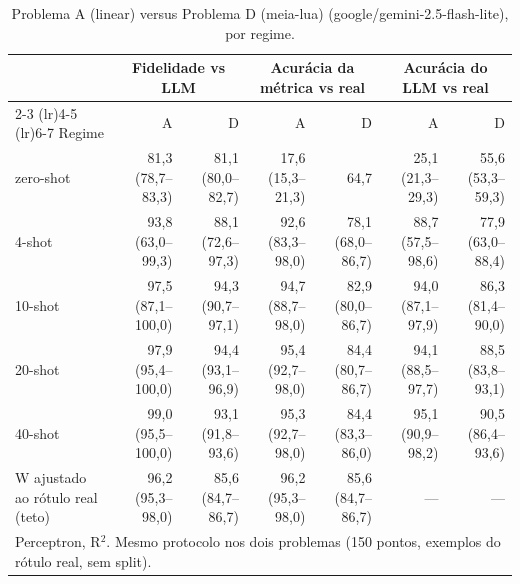 \begin{table}[htbp]
\centering
\small
\caption{Problema A (linear) versus Problema D (meia-lua) (google/gemini-2.5-flash-lite), por regime.}
\label{tab:bloco1_A_vs_D_por_regime_flashlite}
\begin{tabular}{lrrrrrr}
\toprule
 & \multicolumn{2}{c}{Fidelidade vs LLM} & \multicolumn{2}{c}{Acurácia da métrica vs real} & \multicolumn{2}{c}{Acurácia do LLM vs real} \\ \cmidrule(lr){2-3} \cmidrule(lr){4-5} \cmidrule(lr){6-7}
Regime & A & D & A & D & A & D \\
\midrule
zero-shot & 81,3 (78,7–83,3) & 81,1 (80,0–82,7) & 17,6 (15,3–21,3) & 64,7 & 25,1 (21,3–29,3) & 55,6 (53,3–59,3) \\
4-shot & 93,8 (63,0–99,3) & 88,1 (72,6–97,3) & 92,6 (83,3–98,0) & 78,1 (68,0–86,7) & 88,7 (57,5–98,6) & 77,9 (63,0–88,4) \\
10-shot & 97,5 (87,1–100,0) & 94,3 (90,7–97,1) & 94,7 (88,7–98,0) & 82,9 (80,0–86,7) & 94,0 (87,1–97,9) & 86,3 (81,4–90,0) \\
20-shot & 97,9 (95,4–100,0) & 94,4 (93,1–96,9) & 95,4 (92,7–98,0) & 84,4 (80,7–86,7) & 94,1 (88,5–97,7) & 88,5 (83,8–93,1) \\
40-shot & 99,0 (95,5–100,0) & 93,1 (91,8–93,6) & 95,3 (92,7–98,0) & 84,4 (83,3–86,0) & 95,1 (90,9–98,2) & 90,5 (86,4–93,6) \\
\midrule
W ajustado ao rótulo real (teto) & 96,2 (95,3–98,0) & 85,6 (84,7–86,7) & 96,2 (95,3–98,0) & 85,6 (84,7–86,7) & — & — \\
\bottomrule
\multicolumn{7}{p{0.95\linewidth}}{\footnotesize Perceptron, R$^2$. Mesmo protocolo nos dois problemas (150 pontos, exemplos do rótulo real, sem split).} \\
\end{tabular}
\end{table}
